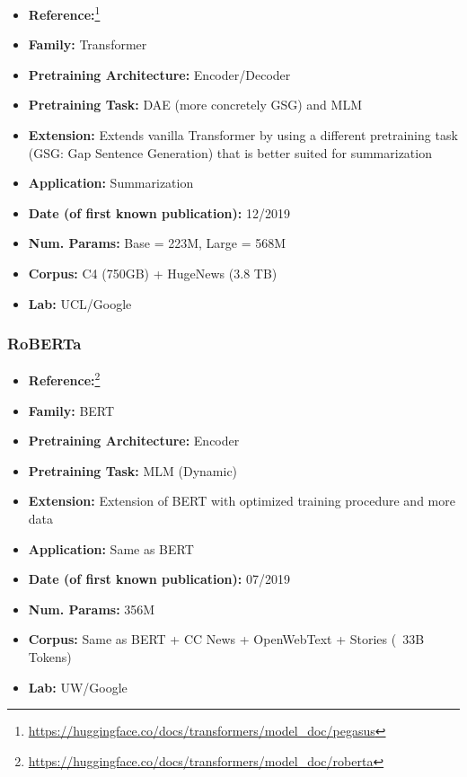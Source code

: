 \documentclass{article}
\begin{document}
            \begin{itemize}
                \item \textbf{Reference:}\footnote{\url{https://huggingface.co/docs/transformers/model_doc/pegasus}}\cite{zhang2020pegasus}
                \item \textbf{Family:}  Transformer
                \item \textbf{Pretraining Architecture:} Encoder/Decoder
                \item \textbf{Pretraining Task:} DAE (more concretely GSG) and MLM
                \item \textbf{Extension:} Extends vanilla Transformer by using a different pretraining task (GSG: Gap Sentence Generation) that is better suited for summarization  
                \item \textbf{Application:} Summarization
                \item \textbf{Date (of first known publication):} 12/2019
                \item \textbf{Num. Params:} Base = 223M, Large = 568M
                \item \textbf{Corpus:} C4 (750GB) + HugeNews (3.8 TB)
                \item \textbf{Lab:} UCL/Google
            \end{itemize}

\subsubsection{RoBERTa}

            \begin{itemize}
                \item \textbf{Reference:}\footnote{\url{https://huggingface.co/docs/transformers/model_doc/roberta}}\cite{liu2019roberta}
                \item \textbf{Family:} BERT 
                \item \textbf{Pretraining Architecture:} Encoder
                \item \textbf{Pretraining Task:} MLM (Dynamic)
                \item \textbf{Extension:} Extension of BERT with optimized training procedure and more data  
                \item \textbf{Application:} Same as BERT
                \item \textbf{Date (of first known publication):} 07/2019
                \item \textbf{Num. Params:} 356M
                \item \textbf{Corpus:} Same as BERT + CC News + OpenWebText + Stories (~33B Tokens)
                \item \textbf{Lab:} UW/Google
            \end{itemize}
\end{document}
